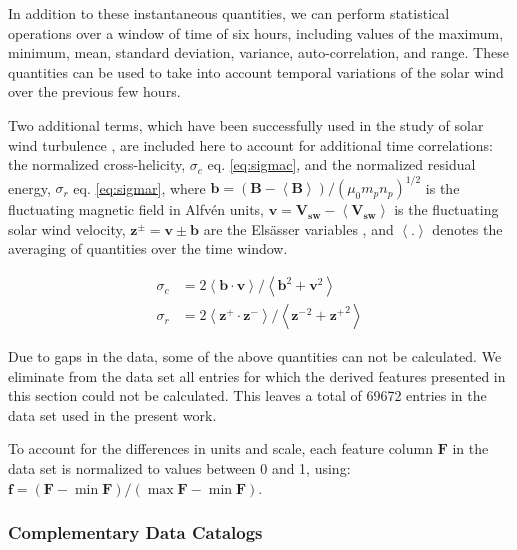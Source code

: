 In addition to these instantaneous quantities, we can perform statistical operations over a window of time of six hours, including values of the maximum, minimum, mean, standard deviation, variance, auto-correlation, and range. These quantities can be used to take into account temporal variations of the solar wind over the previous few hours.

Two additional terms, which have been successfully used in the study of solar wind turbulence \citep{SEE ROBERTS REFS}, are included here to account for additional time correlations: the normalized cross-helicity, $\sigma_c$ eq. \eqref{eq:sigmac}, and the normalized residual energy, $\sigma_r$ eq. \eqref{eq:sigmar}, where $\boldsymbol{b} = \left(\boldsymbol{B}- \boldsymbol{\left<B\right>}\right)/(\mu_0m_pn_p)^{1/2}$ is the fluctuating magnetic field in Alfv\'en units, $\boldsymbol{v} = \boldsymbol{V_{sw}}- \boldsymbol{\left<V_{sw}\right>}$ is the fluctuating solar wind velocity, $\boldsymbol{z^\pm} = \boldsymbol{v} \pm \boldsymbol{b}$ are the Els\"asser variables \citep{Elssaser1950, Magyar2019}, and $\left<.\right>$ denotes the averaging of quantities over the time window.

\begin{align}
\sigma_c & = 2 \left< \boldsymbol{b}\cdot\boldsymbol{v}\right>/\left<\boldsymbol{b}^2 + \boldsymbol{v}^2\right> \label{eq:sigmac} \\
\sigma_r & = 2 \left< \boldsymbol{z^+}\cdot\boldsymbol{z^-}\right>/\left<\boldsymbol{z^-}^2 + \boldsymbol{z^+}^2\right> \label{eq:sigmar}
\end{align}

Due to gaps in the data, some of the above quantities can not be calculated. We eliminate from the data set all entries for which the derived features presented in this section could not be calculated. This leaves a total of 69672 entries in the data set used in the present work.

To account for the differences in units and scale, each feature column $\boldsymbol{F}$ in the data set is normalized to values between 0 and 1, using: $\boldsymbol{f}=\left(\boldsymbol{F}-\min{\boldsymbol{F}}\right) /\left(\max{\boldsymbol{F}}-\min{\boldsymbol{F}}\right)$.

\subsubsection{Complementary Data Catalogs}
